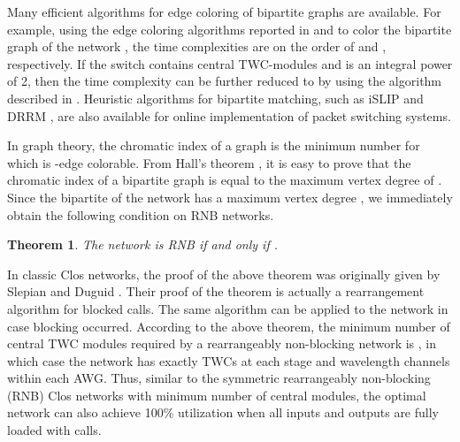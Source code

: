 \documentclass[journal]{IEEEtran}
\newtheorem{theorem}{\textbf{Theorem}}
\begin{document}
Many efficient algorithms for edge coloring of bipartite graphs are
available. For example, using the edge coloring algorithms reported
in \cite{Cole:C2001} and \cite{Ttlee:IJCM2013} to color the
bipartite graph  of the network , the time complexities are on the order of 
and , respectively. If the switch contains  central
TWC-modules and  is an integral power of 2, then the time
complexity can be further reduced to  by
using the algorithm described in \cite{Ttlee:TCOM2002}. Heuristic
algorithms for bipartite matching, such as iSLIP
\cite{McKeown:TON1999} and DRRM \cite{Chao:book2001}, are also
available for online implementation of packet switching systems.

In graph theory, the chromatic index  of a graph  is the
minimum number  for which  is -edge colorable. From Hall's
theorem \cite{Hall:JLMS1936}, it is easy to prove that the chromatic
index  of a bipartite graph  is equal to the maximum
vertex degree  of . Since the bipartite  of
the network  has a maximum vertex degree
, we immediately obtain the following condition on RNB
networks.

\begin{theorem}\label{theorem_SA}
The network  is RNB if and only if .
\end{theorem}

In classic Clos networks, the proof of the above theorem was
originally given by Slepian \cite{Slepian:U1952} and Duguid
\cite{Duguid:T1959}. Their proof of the theorem is actually a
rearrangement algorithm for blocked calls. The same algorithm can be
applied to the network  in case blocking
occurred. According to the above theorem, the minimum number of
central TWC modules required by a rearrangeably non-blocking network
 is , in which case the network
 has exactly  TWCs at each stage and
 wavelength channels within each AWG. Thus, similar to the
symmetric rearrangeably non-blocking (RNB) Clos networks with
minimum number of central modules, the optimal network
 can also achieve 100\% utilization when all
inputs and outputs are fully loaded with  calls.
\end{document}
